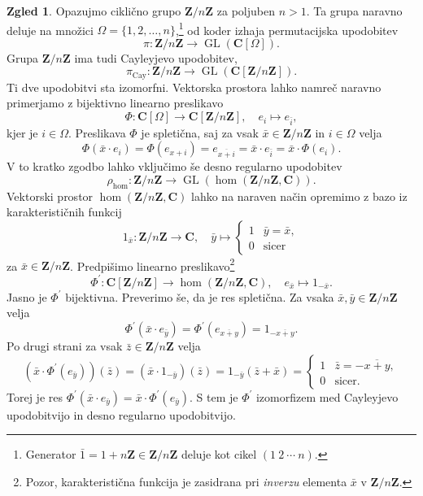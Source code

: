 \documentclass[11pt]{book}
\def\ZZ{\mathbf{Z}}
\def\CC{\mathbf{C}}
\DeclareMathOperator\GL{GL}
\DeclareMathOperator\Cay{Cay}
\theoremstyle{definition}
\theoremstyle{zgled}
\newtheorem*{zgled}{Zgled}
\theoremstyle{odprtproblem}
\theoremstyle{domacanaloga}
\theoremstyle{izrek}
\begin{document}
\begin{zgled}
    Opazujmo ciklično grupo $\ZZ/n\ZZ$ za poljuben $n > 1$.
    Ta grupa naravno deluje na množici $\Omega = \{ 1, 2, \dots, n \}$,\footnote{Generator $\bar 1 = 1 + n\ZZ \in \ZZ/n\ZZ$ deluje kot cikel $(1 \ 2 \ \cdots \ n)$.} od koder izhaja permutacijska upodobitev
    \[
        \pi \colon \ZZ/n\ZZ \to \GL(\CC[\Omega]).
    \]
    Grupa $\ZZ/n\ZZ$ ima tudi Cayleyjevo upodobitev,
    \[
        \pi_{\Cay} \colon \ZZ/n\ZZ \to \GL(\CC[\ZZ/n\ZZ]).
    \]
    Ti dve upodobitvi sta izomorfni. Vektorska prostora lahko namreč naravno primerjamo z bijektivno linearno preslikavo
    \[
        \Phi \colon \CC[\Omega] \to \CC[\ZZ/n\ZZ], \quad    
        e_i \mapsto e_{\bar i},
    \]
    kjer je $i \in \Omega$. Preslikava $\Phi$ je spletična, saj za vsak $\bar x \in \ZZ/n\ZZ$ in $i \in \Omega$ velja
    \[
        \Phi(\bar x \cdot e_i) 
        = \Phi(e_{x + i})
        = e_{\overline{x + i}}
        = \bar x \cdot e_{\bar i}
        = \bar x \cdot \Phi(e_i).
    \]
    V to kratko zgodbo lahko vključimo še desno regularno upodobitev
    \[
        \rho_{\hom} \colon \ZZ/n\ZZ \to \GL(\hom(\ZZ/n\ZZ,\CC)).
    \]
    Vektorski prostor $\hom(\ZZ/n\ZZ, \CC)$ lahko na naraven način opremimo z bazo iz karakterističnih funkcij
    \[
        1_{\bar x} \colon \ZZ/n\ZZ \to \CC, \quad
        \bar y \mapsto \begin{cases}
            1 & \bar y = \bar x, \\
            0 & \text{sicer}
        \end{cases}
    \]
    za $\bar x \in \ZZ/n\ZZ$. Predpišimo linearno preslikavo\footnote{Pozor, karakteristična funkcija je zasidrana pri {\em inverzu} elementa $\bar x$ v $\ZZ/n\ZZ$.}
    \[
        \Phi^\prime \colon \CC[\ZZ/n\ZZ] \to \hom(\ZZ/n\ZZ, \CC), \quad
        e_{\bar x} \mapsto 1_{- \bar x}.
    \]
    Jasno je $\Phi^\prime$ bijektivna. Preverimo še, da je res spletična. Za vsaka $\bar x, \bar y \in \ZZ/n\ZZ$ velja
    \[
        \Phi^\prime(\bar x \cdot e_{\bar y})
        = \Phi^\prime(e_{\overline{x + y}})
        = 1_{- \overline{x + y}}.
    \]
    Po drugi strani za vsak $\bar z \in \ZZ/n\ZZ$ velja
    \[
        \left( \bar x \cdot \Phi^\prime(e_{\bar y}) \right) (\bar z)
        = \left( \bar x \cdot 1_{- \bar y} \right) (\bar z)
        = 1_{- \bar y}(\bar z + \bar x)
        = \begin{cases}
            1 & \bar z = - \overline{x + y}, \\
            0 & \text{sicer}.
        \end{cases}
    \]
    Torej je res $\Phi^\prime(\bar x \cdot e_{\bar y}) = \bar x \cdot \Phi^\prime(e_{\bar y})$. S tem je $\Phi^\prime$ izomorfizem med Cayleyjevo upodobitvijo in desno regularno upodobitvijo.
\end{zgled}
\end{document}
